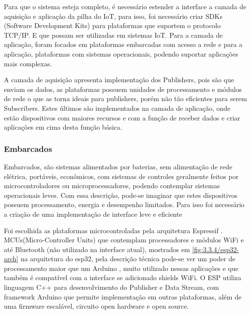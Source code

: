 Para que o sistema esteja completo, é necessário estender a interface a camada de aquisição e aplicação da pilha do IoT, para isso, foi necessário criar SDKs (Software Development Kits) para plataformas que suportem o protocolo TCP/IP. E que possam ser utilizadas em sistemas IoT. Para a camada de aplicação, foram focados em plataformas embarcadas com acesso a rede e para a aplicação, plataformas com sistemas operacionais, podendo suportar aplicações mais complexas.

A camada de aquisição apresenta implementação dos Publishers, pois são que enviam os dados, as plataformas possuem unidades de processamento e módulos de rede o que as torna ideais para publishers, porém não tão eficientes para serem Subscribers. Estes últimos são implementados na camada de aplicação, onde estão dispositivos com maiores recursos e com a função de receber dados e criar aplicações em cima desta função básica.

\subsubsection{Embarcados}
\label{subsubsection:embarcados}

Embarcados, são sistemas alimentados por baterias, sem alimentação de rede elétrica, portáveis, econômicos, com sistemas de controles geralmente feitos por microcontroladores ou microprocessadores, podendo contemplar sistemas operacionais leves. Com essa descrição, pode-se imaginar que estes dispositivos possuem processamento, energia e desempenho limitados. Para isso foi necessário a criação de uma implementação de interface leve e eficiente

Foi escolhida as plataformas microcontroladas pela arquitetura Espressif \cite{espressif}. MCUs(Micro-Controller Units) que contemplam processadores e módulos WiFi e até Bluetooth (não utilizado na interface atual), mostrados em \ref{fig:3.3.4/esp32-arch} na arquitetura do esp32, pela descrição técnica pode-se ver um poder de processamento maior que um Arduino \cite{arduino}, muito utilizado nessas aplicações e que também é compatível com a interface se adicionado shields WiFi. O ESP utiliza linguagem C++ \cite{c++} para desenvolvimento do Publisher e Data Stream, com framework Arduino que permite implementação em outras plataformas, além de uma firmware escalável, circuito open hardware e open source.

